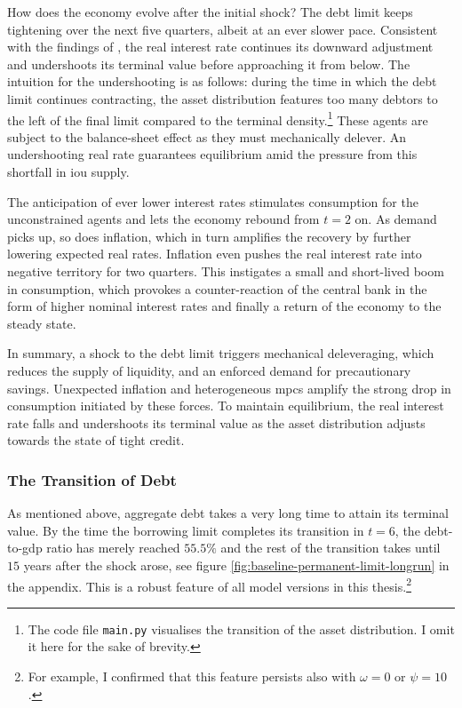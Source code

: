 \documentclass[a4paper,12pt]{article} %
\numberwithin{equation}{section} %
\numberwithin{figure}{section}
\numberwithin{table}{section}
\begin{document}
How does the economy evolve after the initial shock? The debt limit keeps tightening over the next five quarters, albeit at an ever slower pace. Consistent with the findings of \textcite{gl2017}, the real interest rate continues its downward adjustment and undershoots its terminal value before approaching it from below. The intuition for the undershooting is as follows: during the time in which the debt limit continues contracting, the asset distribution features too many debtors to the left of the final limit compared to the terminal density.\footnote{The code file \texttt{main.py} visualises the transition of the asset distribution. I omit it here for the sake of brevity.} These agents are subject to the balance-sheet effect as they must mechanically delever. An undershooting real rate guarantees equilibrium amid the pressure from this shortfall in \Gls{iou} supply.

The anticipation of ever lower interest rates stimulates consumption for the unconstrained agents and lets the economy rebound from $t=2$ on. As demand picks up, so does inflation, which in turn amplifies the recovery by further lowering expected real rates. Inflation even pushes the real interest rate into negative territory for two quarters. This instigates a small and short-lived boom in consumption, which provokes a counter-reaction of the central bank in the form of higher nominal interest rates and finally a return of the economy to the steady state.

In summary, a shock to the debt limit triggers mechanical deleveraging, which reduces the supply of liquidity, and an enforced demand for precautionary savings. Unexpected inflation and heterogeneous \Gls{mpc}s amplify the strong drop in consumption initiated by these forces. To maintain equilibrium, the real interest rate falls and undershoots its terminal value as the asset distribution adjusts towards the state of tight credit.

\subsubsection{The Transition of Debt}
\label{sec:limit-transition-debt}

As mentioned above, aggregate debt takes a very long time to attain its terminal value. By the time the borrowing limit completes its transition in $t=6$, the debt-to-\Gls{gdp} ratio has merely reached $55.5\%$ and the rest of the transition takes until $15$ years after the shock arose, see figure \ref{fig:baseline-permanent-limit-longrun} in the appendix. This is a robust feature of all model versions in this thesis.\footnote{For example, I confirmed that this feature persists also with $\omega = 0$ or $\psi = 10$.}
\end{document}
